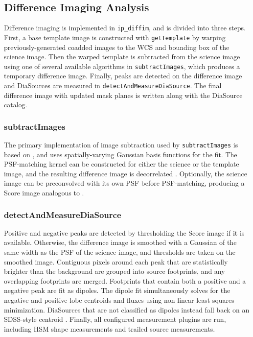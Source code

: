 \subsection{Difference Imaging Analysis}
\label{sec:dia}

Difference imaging is implemented in \texttt{ip\_diffim}, and is divided into three steps.
First, a base template image is constructed with \texttt{getTemplate} by warping previously-generated coadded images to the WCS and bounding box of the science image.
Then the warped template is subtracted from the science image using one of several available algorithms in \texttt{subtractImages}, which produces a temporary difference image.
Finally, peaks are detected on the difference image and DiaSources are measured in \texttt{detectAndMeasureDiaSource}.
The final difference image with updated mask planes is written along with the DiaSource catalog.

\subsubsection{subtractImages}

The primary implementation of image subtraction used by \texttt{subtractImages} is based on \citet{1998ApJ...503..325A}, and uses spatially-varying Gaussian basis functions for the fit.
The PSF-matching kernel can be constructed for either the science or the template image, and the resulting difference image is decorrelated \citet{DMTN-021}.
Optionally, the science image can be preconvolved with its own PSF before PSF-matching, producing a Score image analogous to \citet{2016ApJ...830...27Z}.

\subsubsection{detectAndMeasureDiaSource}

Positive and negative peaks are detected by thresholding the Score image if it is available.
Otherwise, the difference image is smoothed with a Gaussian of the same width as the PSF of the science image, and thresholds are taken on the smoothed image.
Contiguous pixels around each peak that are statistically brighter than the background are grouped into source footprints, and any overlapping footprints are merged.
Footprints that contain both a positive and a negative peak are fit as dipoles.
The dipole fit simultaneously solves for the negative and positive lobe centroids and fluxes using non-linear least squares minimization.
DiaSources that are not classified as dipoles instead fall back on an SDSS-style centroid \citep{2003AJ....125.1559P}.
Finally, all configured measurement plugins are run, including HSM shape measurements \citep{2003MNRAS.343..459H,2005MNRAS.361.1287M} and trailed source measurements.

